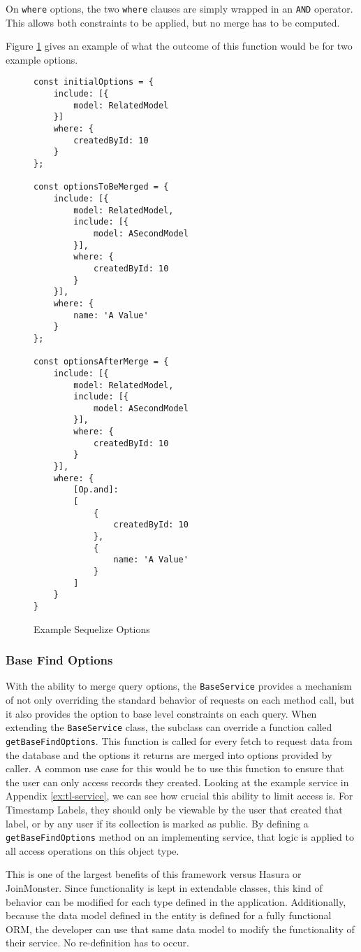 On \verb!where! options, the two \verb!where! clauses are simply wrapped in an \verb!AND! operator.  This allows both constraints to be applied, but no merge has to be computed.

Figure \ref{fig:merge-options} gives an example of what the outcome of this function would be for two example options.

\begin{figure}
    \begin{Verbatim}[fontsize=\footnotesize]
const initialOptions = {
    include: [{
        model: RelatedModel
    }]
    where: {
        createdById: 10
    }
};

const optionsToBeMerged = {
    include: [{
        model: RelatedModel,
        include: [{
            model: ASecondModel
        }],
        where: {
            createdById: 10
        }
    }],
    where: {
        name: 'A Value'
    }
};

const optionsAfterMerge = {
    include: [{
        model: RelatedModel,
        include: [{
            model: ASecondModel
        }],
        where: {
            createdById: 10
        }
    }],
    where: {
        [Op.and]: 
        [
            {
                createdById: 10
            },
            {
                name: 'A Value'
            }
        ]
    }
}
    \end{Verbatim}
    \caption{Example Sequelize Options}
    \label{fig:merge-options}
\end{figure}

\subsubsection{Base Find Options}
With the ability to merge query options, the \verb!BaseService! provides a mechanism of not only overriding the standard behavior of requests on each method call, but it also provides the option to base level constraints on each query.  When extending the \verb!BaseService! class, the subclass can override a function called \verb!getBaseFindOptions!.  This function is called for every fetch to request data from the database and the options it returns are merged into options provided by caller.  A common use case for this would be to use this function to ensure that the user can only access records they created.  Looking at the example service in Appendix \ref{ex:tl-service}, we can see how crucial this ability to limit access is.  For Timestamp Labels, they should only be viewable by the user that created that label, or by any user if its collection is marked as public.  By defining a \verb!getBaseFindOptions! method on an implementing service, that logic is applied to all access operations on this object type.  

This is one of the largest benefits of this framework versus Hasura or JoinMonster.  Since functionality is kept in extendable classes, this kind of behavior can be modified for each type defined in the application. Additionally, because the data model defined in the entity is defined for a fully functional ORM, the developer can use that same data model to modify the functionality of their service. No re-definition has to occur.